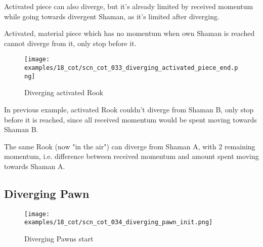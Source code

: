 \vspace*{-0.4\baselineskip}
Activated piece can also diverge, but it's already limited by received momentum
while going towards divergent Shaman, as it's limited after diverging.

Activated, material piece which has no momentum when own Shaman is reached cannot
diverge from it, only stop before it.

\clearpage %

\vspace*{-2.1\baselineskip}
\noindent
\begin{figure}[!h]
\texttt{[image: examples/18\_cot/scn\_cot\_033\_diverging\_activated\_piece\_end.png]}
\vspace*{-1.3\baselineskip}
\caption{Diverging activated Rook}
\label{fig:scn_cot_033_diverging_activated_piece_end}
\end{figure}

\vspace*{-0.4\baselineskip}
In previous example, activated Rook couldn't diverge from Shaman B, only stop before
it is reached, since all received momentum would be spent moving towards Shaman B.

The same Rook (now "in the air") can diverge from Shaman A, with 2 remaining momentum,
i.e. difference between received momentum and amount spent moving towards Shaman A.

\clearpage %

\subsection*{Diverging Pawn}
\label{sec:Conquest of Tlalocan/Divergence/Diverging Pawn/2} %

\vspace*{-1.4\baselineskip}
\noindent
\begin{figure}[!h]
\texttt{[image: examples/18\_cot/scn\_cot\_034\_diverging\_pawn\_init.png]}
\vspace*{-1.3\baselineskip}
\caption{Diverging Pawns start}
\label{fig:scn_cot_034_diverging_pawn_init}
\end{figure}

